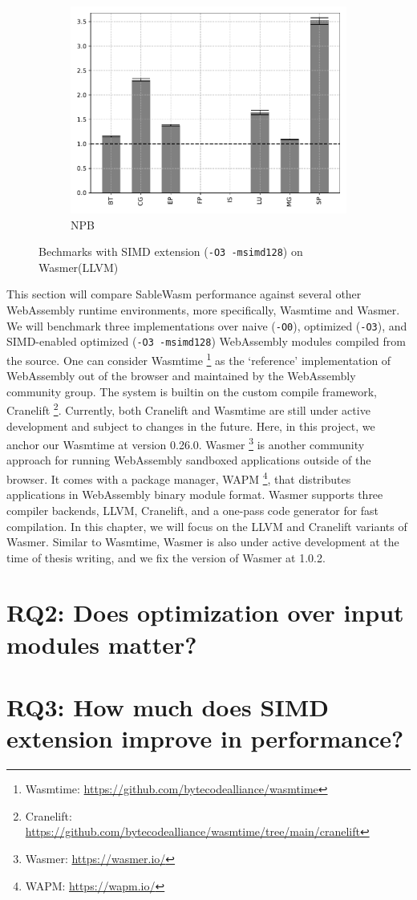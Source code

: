 \begin{figure}
\begin{subfigure}[t]{.45\textwidth}
        \includegraphics[width=\textwidth]
        {Images/6.1.RQ1/npb-wasmer-llvm-simd.pdf}
        \caption{NPB}
    \end{subfigure}
    \caption{Bechmarks with SIMD extension (\texttt{-O3 -msimd128}) on Wasmer(LLVM)}
\end{figure}

This section will compare SableWasm performance against several other WebAssembly runtime environments, more specifically, Wasmtime and Wasmer. We will benchmark three implementations over naive (\texttt{-O0}), optimized (\texttt{-O3}), and SIMD-enabled optimized (\texttt{-O3 -msimd128}) WebAssembly modules compiled from the source. One can consider Wasmtime \footnote{Wasmtime: \url{https://github.com/bytecodealliance/wasmtime}} as the `reference' implementation of WebAssembly out of the browser and maintained by the WebAssembly community group. The system is builtin on the  custom compile framework, Cranelift \footnote{Cranelift: \url{https://github.com/bytecodealliance/wasmtime/tree/main/cranelift}}. Currently, both Cranelift and Wasmtime are still under active development and subject to changes in the future. Here, in this project, we anchor our Wasmtime at version 0.26.0. Wasmer \footnote{Wasmer: \url{https://wasmer.io/}} is another community approach for running WebAssembly sandboxed applications outside of the browser. It comes with a package manager, WAPM \footnote{WAPM: \url{https://wapm.io/}}, that distributes applications in WebAssembly binary module format. Wasmer supports three compiler backends, LLVM, Cranelift, and a one-pass code generator for fast compilation. In this chapter, we will focus on the LLVM and Cranelift variants of Wasmer. Similar to Wasmtime, Wasmer is also under active development at the time of thesis writing, and we fix the version of Wasmer at 1.0.2.


\section[RQ2: Does optimization over input modules matter?]{
  {\large RQ2: Does optimization over input modules matter?}}

\section[RQ3: How much does SIMD extension improve in performance?]{
  {\large RQ3: How much does SIMD extension improve in performance?}}